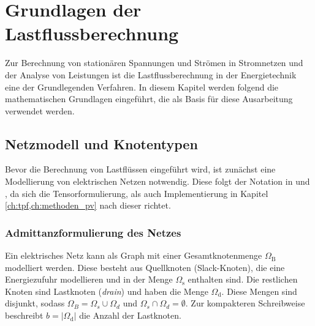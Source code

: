 \chapter{Grundlagen der Lastflussberechnung}
\label{ch:grundlagen}

Zur Berechnung von stationären Spannungen und Strömen in Stromnetzen und der Analyse von Leistungen ist die Lastflussberechnung in der Energietechnik eine der Grundlegenden Verfahren. In diesem Kapitel werden folgend die mathematischen Grundlagen eingeführt, die als Basis für diese Ausarbeitung verwendet werden.



\section{Netzmodell und Knotentypen}
\label{sec:netzmodell}

Bevor die Berechnung von Lastflüssen eingeführt wird, ist zunächst eine Modellierung von elektrischen Netzen notwendig.
Diese folgt der Notation in \cite{Salazar2024} und \cite{Giraldo2022}, da sich die Tensorformulierung, als auch Implementierung in Kapitel \cref{ch:tpf,ch:methoden_pv} nach dieser richtet.  


\subsection{Admittanzformulierung des Netzes}
\label{subsec:admittanz}

Ein elektrisches Netz kann als Graph mit einer Gesamtknotenmenge $\Omega_\mathrm{B}$ modelliert werden. Diese besteht aus Quellknoten (Slack-Knoten), die eine Energiezufuhr modellieren und in der Menge $\Omega_\mathrm{s}$ enthalten sind. Die restlichen Knoten sind Lastknoten (\emph{drain}) und haben die Menge $\Omega_\mathrm{d}$. Diese Mengen sind disjunkt, sodass $\Omega_B = \Omega_s \cup \Omega_d$ und $\Omega_s \cap \Omega_d = \emptyset$. Zur kompakteren Schreibweise beschreibt $b = |\Omega_\mathrm{d}|$ die Anzahl der Lastknoten.\\

